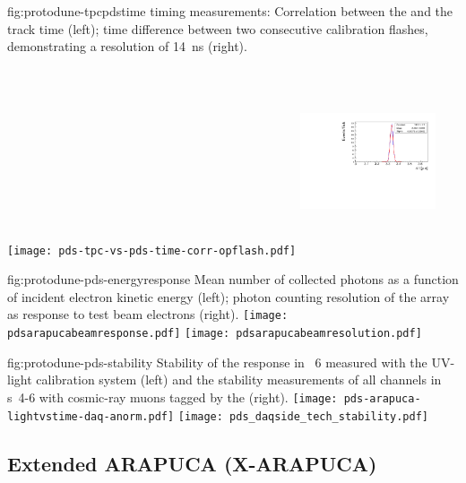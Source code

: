 \begin{dunefigure}{fig:protodune-tpcpdstime}
{ timing measurements: Correlation between the  and the  track time (left); time difference between two consecutive calibration flashes, demonstrating a resolution of \SI{14}{ns} (right).}

\texttt{[image: pds-tpc-vs-pds-time-corr-opflash.pdf]}
\includegraphics[height=5.5cm,width=0.3\textwidth]{graphics/pds-example-dT.pdf}
\end{dunefigure}

\begin{dunefigure}{fig:protodune-pds-energyresponse}
{Mean number of collected photons as a function of incident electron kinetic energy (left);  photon counting resolution of the  array as response to test beam electrons (right).}
\texttt{[image: pdsarapucabeamresponse.pdf]}
\texttt{[image: pdsarapucabeamresolution.pdf]}

\end{dunefigure}

\begin{dunefigure}{fig:protodune-pds-stability}
{Stability of the  response in ~6 measured with the UV-light calibration system (left) and the stability measurements of all  channels in s~4-6 with cosmic-ray muons tagged by the  (right).}
\texttt{[image: pds-arapuca-lightvstime-daq-anorm.pdf]}
\texttt{[image: pds\_daqside\_tech\_stability.pdf]}
\end{dunefigure}

 
\subsection{Extended ARAPUCA (X-ARAPUCA)}
\label{sec:xarapuca-valid}


